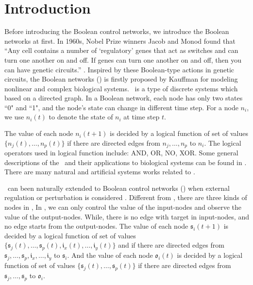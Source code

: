 \section{Introduction}
\label{sec:intro}


Before introducing the Boolean control networks, we introduce the Boolean networks at first. In 1960s, Nobel Prize winners Jacob and Monod found that ``Any cell contains a number of `regulatory' genes that act as switches and can turn one another on and off. If genes can turn one another on and off, then you can have genetic circuits.'' \cite{Jacob1961Genetic}. Inspired by these Boolean-type actions in genetic circuits, the Boolean networks (\BNs) is firstly proposed by Kauffman \cite{Kauffman1968Metabolic} for modeling nonlinear and complex biological systems. \BNs\ is a type of discrete systems which based on a directed graph. In a Boolean network, each node has only two states ``0" and ``1", and
the node's state     can change in different  time step.  For a node $n_i$, we use $n_i(t)$ to denote the state of $n_i$ at time step $t$.

The value of each node $n_i(t+1)$ is decided by a logical function of  set of  values  $\{n_j(t),\ldots,n_p(t)\}$ if  there are directed edges from $n_j,\ldots,n_p$ to $n_i$.%
The logical operators used in  logical function include: AND, OR, NO, XOR. Some general descriptions of the \BNs\ and their applications to biological systems can be found in \cite{Kauffman1968Metabolic}.
There are many natural and artificial systems works \cite{Akutsu2000Inferring, Shmulevich2002From, Faur2006Dynamical,Green2007The,Lou2010Multi} related to \BNs.
 

         \BNs\ can been naturally extended to Boolean control networks (\BCNs) when external regulation or perturbation is considered \cite{Ideker2001A}. Different from \BNs, there are three kinds of nodes in \BCNs,  In \BCNs, we can only control the value of the input-nodes and observe the value of the output-nodes. While, there is no edge with target in input-nodes, and no edge starts from the output-nodes. The value of each node $\mathfrak{s}_i(t+1)$ is decided by a logical function of set of  values  $\{\mathfrak{s}_j(t),\ldots,\mathfrak{s}_p(t),\mathfrak{i}_x(t),\ldots,\mathfrak{i}_y(t)\}$ and if there are directed edges from $\mathfrak{s}_j,\ldots,\mathfrak{s}_p,\mathfrak{i}_x,\ldots,\mathfrak{i}_y$ to $\mathfrak{s}_i$. And the value of each node $\mathfrak{o}_i(t)$ is decided by a logical function of  set of  values  $\{\mathfrak{s}_j(t),\ldots,\mathfrak{s}_p(t)\}$ if  there are directed edges from $\mathfrak{s}_j,\ldots,\mathfrak{s}_p$ to $\mathfrak{o}_i$.

